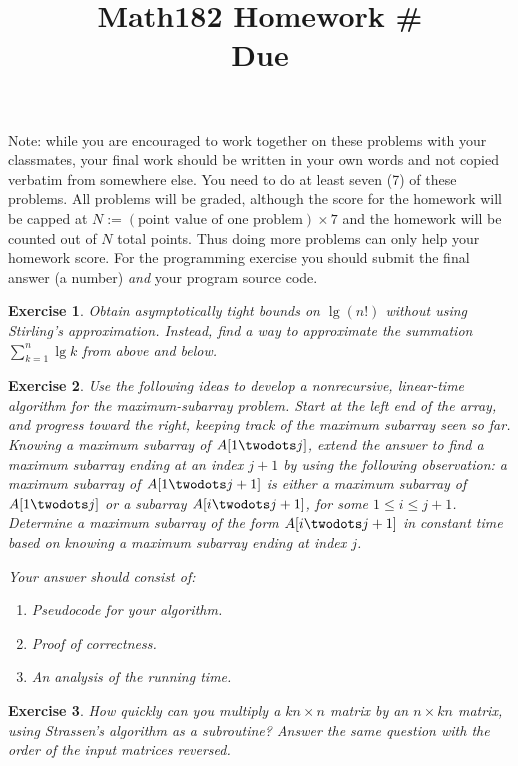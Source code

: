 \documentclass[11pt]{amsart}
\title{Math182 Homework \#\homeworknumber
\\ Due \duedate}
\theoremstyle{theorem}
\newtheorem{exercise}{Exercise}
\newcommand\Lg{\operatorname{lg}}
\begin{document}
\maketitle


Note: while you are encouraged to work together on these problems with your classmates, your final work should be written in your own words and not copied verbatim from somewhere else. You need to do at least seven (7) of these problems. All problems will be graded, although the score for the homework will be capped at $N:=(\text{point value of one problem})\times 7$ and the homework will be counted out of $N$ total points. Thus doing more problems can only help your homework score. For the programming exercise you should submit the final answer (a number) \emph{and} your program source code.

\begin{exercise}
Obtain asymptotically tight bounds on $\Lg(n!)$ without using Stirling's approximation. Instead, find a way to approximate the summation $\sum_{k=1}^n\Lg k$ from above and below.
\end{exercise}



\begin{exercise}
Use the following ideas to develop a nonrecursive, linear-time algorithm for the maximum-subarray problem. Start at the left end of the array, and progress toward the right, keeping track of the maximum subarray seen so far. Knowing a maximum subarray of $A[1\twodots j]$, extend the answer to find a maximum subarray ending at an index $j+1$ by using the following observation: a maximum subarray of $A[1\twodots j+1]$ is either a maximum subarray of $A[1\twodots j]$ or a subarray $A[i\twodots j+1]$, for some $1\leq i\leq j+1$. Determine a maximum subarray of the form $A[i\twodots j+1]$ in constant time based on knowing a maximum subarray ending at index $j$.

Your answer should consist of:
\begin{enumerate}
\item Pseudocode for your algorithm.
\item Proof of correctness.
\item An analysis of the running time.
\end{enumerate}
\end{exercise}

\begin{exercise}
How quickly can you multiply a $kn\times n$ matrix by an $n\times kn$ matrix, using Strassen's algorithm as a subroutine? Answer the same question with the order of the input matrices reversed.
\end{exercise}
\end{document}
